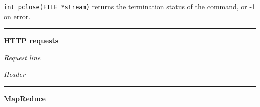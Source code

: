 \documentclass{article}
\begin{document}
\begin{multicols}{2}
  {\tt int pclose(FILE *stream)} returns the termination status of the command,
  or -1 on error.

  \noindent\rule{4cm}{0.4pt}

  {\bf HTTP requests}

  {\it Request line}

  {\it Header}

  \noindent\rule{4cm}{0.4pt}

  {\bf MapReduce}

\end{multicols}
\end{document}
